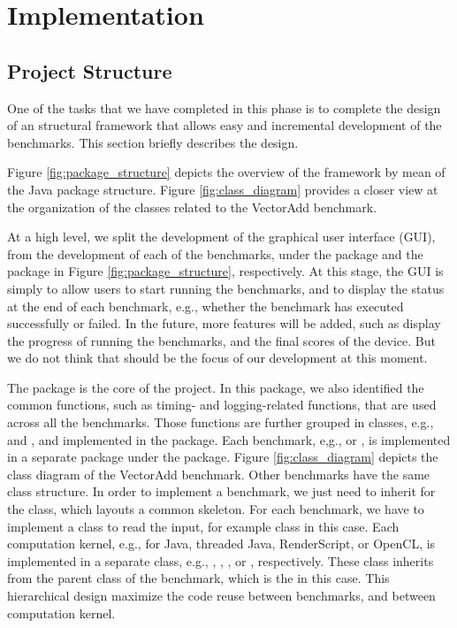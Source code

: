 
\section*{Implementation}

\subsection*{Project Structure}

One of the tasks that we have completed in this phase is to complete the design
of an structural framework that allows easy and incremental development of the
benchmarks. This section briefly describes the design.

Figure \ref{fig:package_structure} depicts the overview of the framework by mean
of the Java package structure. Figure \ref{fig:class_diagram} provides a closer
view at the organization of the classes related to the VectorAdd benchmark.

At a high level, we split the development of the graphical user interface (GUI),
from the development of each of the benchmarks, under the  package and the
 package in Figure \ref{fig:package_structure}, respectively. At this
stage, the GUI is simply to allow users to start running the benchmarks, and to 
display the status at the end of each benchmark, e.g., whether the benchmark has executed
successfully or failed. In the future, more features will be added, such as
display the progress of running the benchmarks, and the final scores of the
device. But we do not think that should be the focus of our development at this
moment.

The  package is the core of the project. In this package, we also
identified the common functions, such as timing- and logging-related functions,
that are used across all the benchmarks. Those functions are further grouped in
classes, e.g.,  and , and implemented in the 
package. Each benchmark, e,g.,  or , is implemented in a
separate package under the  package. Figure
\ref{fig:class_diagram} depicts the class diagram of the VectorAdd benchmark.
Other benchmarks have the same class structure. In order to implement a
benchmark, we just need to inherit for the  class, which
layouts a common skeleton. For each benchmark, we have to implement a class to
read the input, for example  class in this case. Each
computation kernel, e.g., for Java, threaded Java, RenderScript, or OpenCL, is
implemented in a separate class, e.g., ,
, , or ,
respectively. These class inherits from the parent class of the benchmark, which
is the  in this case. This hierarchical design maximize
the code reuse between benchmarks, and between computation kernel.

